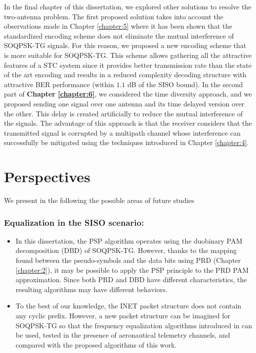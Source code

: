 In the final chapter of this dissertation, we explored other solutions to resolve the two-antenna problem. The first proposed solution takes into account the observations made in Chapter \ref{chapter:5} where it has been shown that the standardized encoding scheme does not eliminate the mutual interference of SOQPSK-TG signals. For this reason, we proposed a new encoding scheme that is more suitable for SOQPSK-TG. This scheme allows gathering all the attractive features of a STC system since it provides better transmission rate than the state of the art encoding and results in a reduced complexity decoding structure with attractive BER performance (within $1.1$ dB of the SISO bound). In the second part of \textbf{Chapter \ref{chapter:6}}, we considered the time diversity approach, and we proposed sending one signal over one antenna and its time delayed version over the other. This delay is created artificially to reduce the mutual interference of the signals. The advantage of this approach is that the receiver considers that the transmitted signal is corrupted by a multipath channel whose interference can successfully be mitigated using the techniques introduced in Chapter \ref{chapter:4}. 

\section*{Perspectives}
We present in the following the possible areas of future studies
\subsubsection*{Equalization in the SISO scenario:} 
\begin{itemize}
\item In this dissertation, the PSP algorithm operates using the duobinary PAM decomposition (DBD) of SOQPSK-TG. However, thanks to the mapping found between the pseudo-symbols and the data bits using PRD (Chapter \ref{chapter:2}), it may be possible to apply the PSP principle to the PRD PAM approximation. Since both PRD and DBD have different characteristics, the resulting algorithms may have different behaviors. 
\item  To the best of our knowledge, the INET packet structure does not contain any cyclic prefix. However, a new packet structure can be imagined for SOQPSK-TG so that the frequency equalization algorithms introduced in \cite{freq_eqz_cpm1,freq_eqz_cpm2,thillo_eqz,chayot_eqz} can be used, tested in the presence of aeronautical telemetry channels, and compared with the proposed algorithms of this work.
\end{itemize} 

